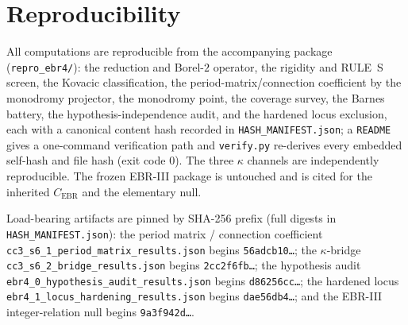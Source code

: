 \documentclass[11pt,reqno]{amsart}
\theoremstyle{plain}
\theoremstyle{definition}
\theoremstyle{remark}
\newcommand{\Cebr}{C_{\mathrm{EBR}}}
\begin{document}
\section*{Reproducibility}
All computations are reproducible from the accompanying package
(\texttt{repro\_ebr4/}): the reduction and Borel-$2$ operator, the rigidity and
RULE~S screen, the Kovacic classification, the period-matrix/connection
coefficient by the monodromy projector, the monodromy point, the coverage
survey, the Barnes battery, the hypothesis-independence audit, and the hardened
locus exclusion, each with a canonical content hash recorded in
\texttt{HASH\_MANIFEST.json}; a \texttt{README} gives a one-command verification
path and \texttt{verify.py} re-derives every embedded self-hash and file hash
(exit code $0$). The three $\kappa$ channels are independently reproducible.
The frozen EBR-III package is untouched and is cited for the inherited
$\Cebr$ and the elementary null.

\medskip\noindent
Load-bearing artifacts are pinned by SHA-256 prefix (full digests in
\texttt{HASH\_MANIFEST.json}): the period matrix / connection coefficient
\texttt{cc3\_s6\_1\_period\_matrix\_results.json} begins
\texttt{56adcb10\dots}; the $\kappa$-bridge
\texttt{cc3\_s6\_2\_bridge\_results.json} begins \texttt{2cc2f6fb\dots}; the
hypothesis audit \texttt{ebr4\_0\_hypothesis\_audit\_results.json} begins
\texttt{d86256cc\dots}; the hardened locus
\texttt{ebr4\_1\_locus\_hardening\_results.json} begins \texttt{dae56db4\dots};
and the EBR-III integer-relation null begins \texttt{9a3f942d\dots}.
\end{document}
